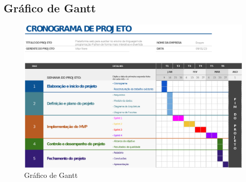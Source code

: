\subsection{Gráfico de Gantt}

\begin{figure}[H]
    \centering
    \includegraphics[width=1.1\textwidth]{figuras/cronograma.eps}
    \caption{Gráfico de Gantt}
    \label{fig:gantt}
\end{figure}
